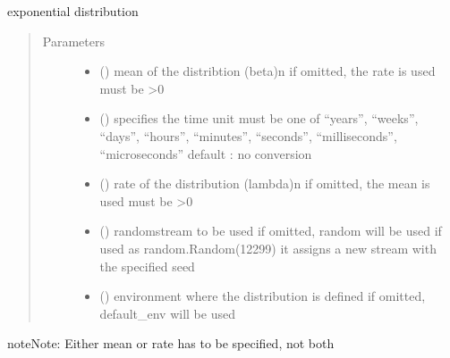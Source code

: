 \documentclass[letterpaper,10pt,english]{sphinxmanual}
\begin{document}
\begin{fulllineitems}
\label{\detokenize{Reference:salabim.Exponential}}
exponential distribution
\begin{quote}\begin{description}
\item[{Parameters}] \leavevmode\begin{itemize}
\item {} 
 () \textendash{} mean of the distribtion (beta)\textbar{}n\textbar{}
if omitted, the rate is used 
must be \textgreater{}0

\item {} 
 () \textendash{} specifies the time unit 
must be one of “years”, “weeks”, “days”, “hours”, “minutes”, “seconds”, “milliseconds”, “microseconds” 
default : no conversion 

\item {} 
 () \textendash{} rate of the distribution (lambda)\textbar{}n\textbar{}
if omitted, the mean is used 
must be \textgreater{}0

\item {} 
 () \textendash{} randomstream to be used 
if omitted, random will be used 
if used as random.Random(12299)
it assigns a new stream with the specified seed

\item {} 
 ({\hyperref[\detokenize{Reference:salabim.Environment}]{}}) \textendash{} environment where the distribution is defined 
if omitted, default\_env will be used

\end{itemize}

\end{description}\end{quote}

\begin{sphinxadmonition}{note}{Note:}
Either mean or rate has to be specified, not both
\end{sphinxadmonition}


\end{fulllineitems}
\end{document}
